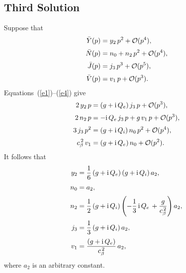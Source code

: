 \documentclass[12pt,prb,aps,notitlepage]{revtex4-1}
\begin{document}
\subsection{Third Solution}
Suppose that
\begin{align}
\bar{Y}(p) &= y_2\,p^2 + {\cal O}(p^4),\\[0.5ex]
\bar{N}(p) &=n_0+n_2\,p^2 + {\cal O}(p^4),\\[0.5ex]
\bar{J}(p) &= j_3\,p^3 + {\cal O}(p^5),\\[0.5ex]
\bar{V} (p)&= v_1\,p +{\cal O}(p^3).
\end{align}
Equations~(\ref{e1})--(\ref{e4}) give 
\begin{align}
2\,y_2\,p &= (g+{\rm i}\,Q_e)\,j_3\,p + {\cal O}(p^3),\\[0.5ex]
2\,n_2\,p& = -{\rm i}\,Q_e\,j_3\,p + g\,v_1\,p +{\cal O}(p^3),\\[0.5ex]
3\,j_3 \,p^2&= (g+{\rm i}\,Q_i)\,n_0\,p^2+{\cal O}(p^4),\\[0.5ex]
c_\beta^{\,2}\,v_1&= (g+{\rm i}\,Q_e)\,n_0 +{ \cal O}(p^2).
\end{align}
It follows that 
\begin{align}
y_2 &= \frac{1}{6}\,(g+{\rm i}\,Q_e)\,(g+{\rm i}\,Q_i)\,a_2,\\[0.5ex]
n_0 &= a_2,\\[0.5ex]
n_2 &= \frac{1}{2}\,(g+{\rm i}\,Q_i)\left(-\frac{1}{3}\,{\rm i}\,Q_e\,+ \frac{g}{c_\beta^{\,2}}\right)a_2,\\[0.5ex]
j_3 &=\frac{1}{3}\,(g+{\rm i}\,Q_i)\,a_2,\\[0.5ex]
v_1 &=\frac{(g+{\rm i}\,Q_e)}{c_\beta^{\,2}}\,a_2,
\end{align}
where $a_2$ is an arbitrary constant. 
\end{document}
